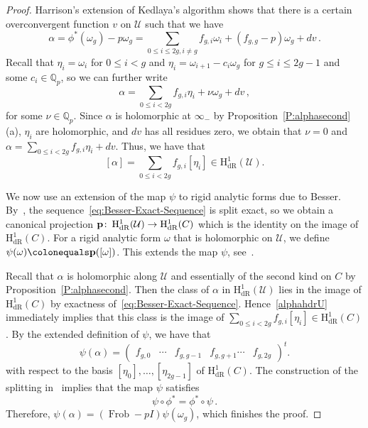 \documentclass[11pt, a4paper]{amsart}
\newcommand{\Q}{\mathbb{Q}}
\newcommand{\calU}{\mathcal{U}}
\newcommand{\hdr}{\operatorname{H^1_{dR}}}
\newcommand{\Frob}{\operatorname{Frob}}
\theoremstyle{remark}
\numberwithin{equation}{section}
\newcommand{\sg}{{}}
\begin{document}
\begin{proof}
Harrison's extension \cite{Harrison-Even-Deg-MW} of Kedlaya's algorithm
  \cite{Kedlaya-MW-reduction} shows that there is a certain overconvergent
  function $v$ on $\calU$
  such that we have 
\[
\alpha=\sg{\phi^*(\omega_g)-p\omega_g}=\sum_{0\leq i\leq 2g, i\neq g}f_{g,i}\omega_i + (f_{g,g}-p)\omega_g + dv\,.
\]
Recall that $\eta_i=\omega_i$ for $0\leq i<g$ and $\eta_i
=\omega_{i+1} -
c_i\omega_g$ for $g\leq i \leq 2g-1$ and some $c_i\in\Q_p$, so we can further write
\[
\alpha=\sum_{0\leq i< 2g}f_{g,i}\eta_i+\nu\omega_g+dv\,,
\]
for some $\nu\in\Q_p$. Since $\alpha$ is holomorphic at $\infty_-$  by Proposition~\ref{P:alphasecond}(a), $\eta_i$ are holomorphic, and $dv$ has all residues zero, we obtain that $\nu=0$ and
$\alpha=\sum_{0\leq i< 2g}f_{g,i}\eta_i+dv$. 
  Thus, we have that
\begin{equation}\label{alphahdrU}
 \sg{[\alpha]=\sum_{0\leq i< 2g}f_{g,i}[\eta_i]\in \hdr(\calU). }
\end{equation}

\sg{We now use an extension of the map $\psi$ to rigid analytic forms due to
Besser.
By~\cite[Proposition~4.8]{Besser-Syntomic-2}, the
sequence~\eqref{eq:Besser-Exact-Sequence} is split exact, so we obtain
a canonical projection ${\bf p}\colon \hdr(\calU)\to \hdr(C)$ which is the
identity on the image of $\hdr(C)$. For a rigid analytic form $\omega$
that is holomorphic on $\calU$, we define $\psi(\omega)\colonequals
\bf{p}([\omega])$. This extends the map $\psi$, see~\cite[Remark~4.12]{Besser-Syntomic-2}.

Recall that $\alpha$ is holomorphic along $\calU$
and essentially of the second kind on $C$ by Proposition~\ref{P:alphasecond}. Then the class of $\alpha$ in $\hdr(\calU)$ lies in the image of $\hdr(C)$ by
exactness of~\eqref{eq:Besser-Exact-Sequence}. Hence~\eqref{alphahdrU} immediately implies that this class is the image of $\sum_{0\leq i< 2g}f_{g,i}[\eta_i]\in \hdr(C)$. By the extended definition of $\psi$, we have that
$$\psi(\alpha)=\begin{pmatrix}
f_{g,0} & \cdots & f_{g,g-1} & f_{g,g+1} \cdots & f_{g,2g}
\end{pmatrix}^t.$$ 
with respect to the basis $[\eta_0],\ldots, [\eta_{2g-1}]$ of $\hdr(C)$.
The construction of the splitting
in~\cite[Proposition~4.8]{Besser-Syntomic-2} implies that the map $\psi$ satisfies
\begin{equation}\label{phipsi}
  \psi\circ \phi^*={\phi^*}\circ \psi\,.
\end{equation}
Therefore, $\psi(\alpha)=(\Frob - pI)\psi(\omega_g)$, which finishes the proof.
}


\end{proof}
\end{document}
